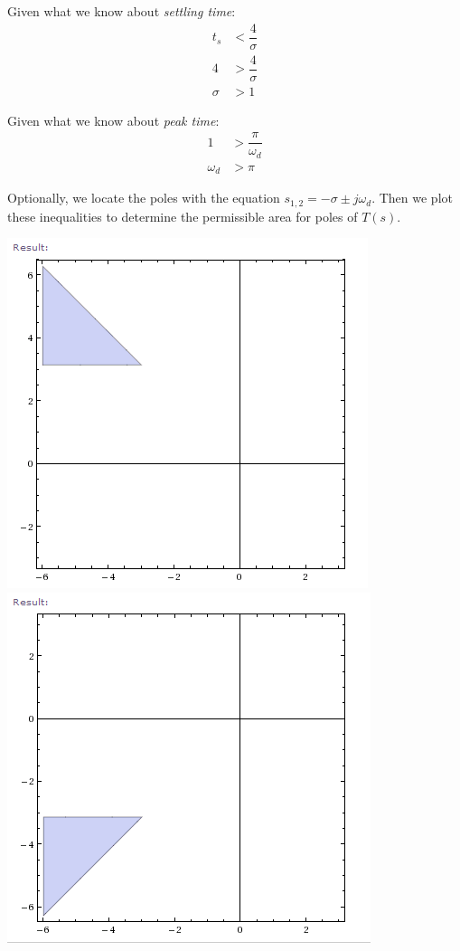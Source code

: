 \documentclass[letterpaper,10pt]{article}
\begin{document}
Given what we know about \emph{settling time}:
\begin{align*}
	t_{s} &< \dfrac{4}{\sigma} \\
	4 &> \dfrac{4}{\sigma} \\
	\sigma &> 1
\end{align*}

Given what we know about \emph{peak time}:
\begin{align*}
	1 &> \dfrac{\pi}{\omega_{d}} \\
	\omega_{d} &> \pi
\end{align*}

Optionally, we locate the poles with the equation $ s_{1, 2} = -\sigma \pm j\omega_{d}$.  Then we plot these inequalities to determine the permissible area for poles of $T(s)$.

\begin{center}
	\includegraphics[scale=0.5]{plot-h02-02}
	\includegraphics[scale=0.5]{plot-h02-01}
\end{center}
\end{document}
